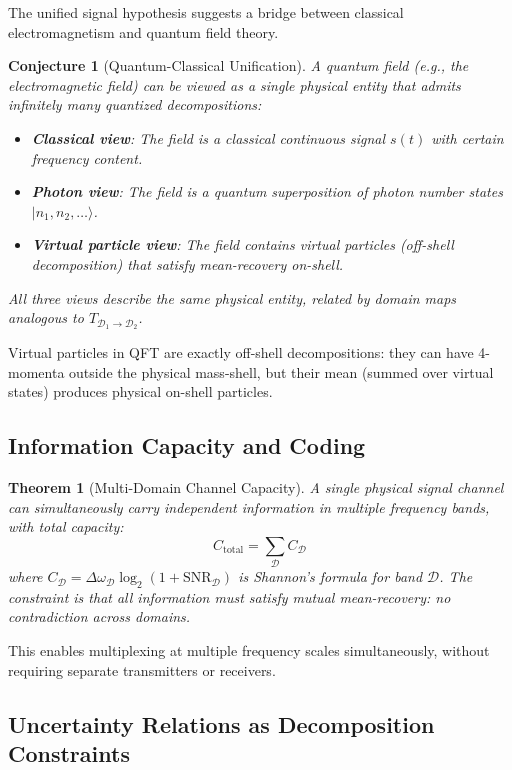\documentclass[twocolumn,11pt,a4paper]{article}
\newtheorem{theorem}{Theorem}[section]
\newtheorem{conjecture}{Conjecture}
\newcommand{\signal}{s}
\newcommand{\bandwidth}{\Delta\omega}
\newcommand{\domain}{\mathcal{D}}
\begin{document}
The unified signal hypothesis suggests a bridge between classical electromagnetism and quantum field theory.

\begin{conjecture}[Quantum-Classical Unification]
A quantum field (e.g., the electromagnetic field) can be viewed as a single physical entity that admits infinitely many quantized decompositions:
\begin{itemize}[nosep]
  \item \textbf{Classical view}: The field is a classical continuous signal $\signal(t)$ with certain frequency content.
  \item \textbf{Photon view}: The field is a quantum superposition of photon number states $|n_1, n_2, \ldots\rangle$.
  \item \textbf{Virtual particle view}: The field contains virtual particles (off-shell decomposition) that satisfy mean-recovery on-shell.
\end{itemize}
All three views describe the same physical entity, related by domain maps analogous to $T_{\domain_1 \to \domain_2}$.
\end{conjecture}

Virtual particles in QFT are exactly off-shell decompositions: they can have 4-momenta outside the physical mass-shell, but their mean (summed over virtual states) produces physical on-shell particles.

\subsection{Information Capacity and Coding}

\begin{theorem}[Multi-Domain Channel Capacity]
A single physical signal channel can simultaneously carry independent information in multiple frequency bands, with total capacity:
\begin{equation}
  C_{\text{total}} = \sum_{\domain} C_{\domain}
\end{equation}
where $C_{\domain} = \bandwidth_\domain \log_2(1 + \text{SNR}_\domain)$ is Shannon's formula for band $\domain$. The constraint is that all information must satisfy mutual mean-recovery: no contradiction across domains.
\end{theorem}

This enables multiplexing at multiple frequency scales simultaneously, without requiring separate transmitters or receivers.

\subsection{Uncertainty Relations as Decomposition Constraints}
\end{document}
